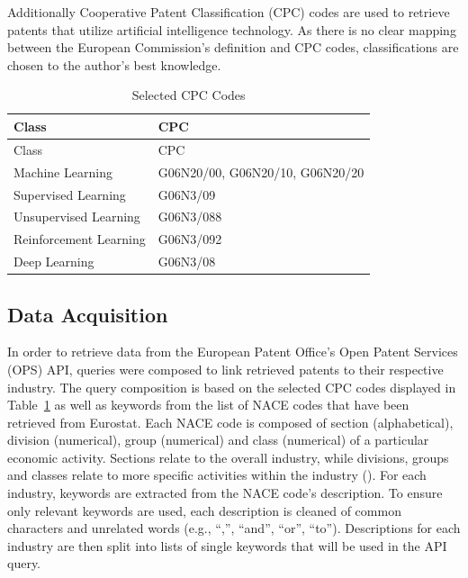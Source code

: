 \documentclass[
  11,
  a4paperpaper,
]{article}
\begin{document}
Additionally Cooperative Patent Classification (CPC) codes are used to
retrieve patents that utilize artificial intelligence technology. As
there is no clear mapping between the European Commission's definition
and CPC codes, classifications are chosen to the author's best
knowledge.


\label{tbl-cpc-codes}
\begin{longtable}[]{@{}ll@{}}
\caption{\label{tbl-cpc-codes}Selected CPC Codes}\tabularnewline
\toprule\noalign{}
Class & CPC \\
\midrule\noalign{}
\endfirsthead
\toprule\noalign{}
Class & CPC \\
\midrule\noalign{}
\endhead
\bottomrule\noalign{}
\endlastfoot
Machine Learning & G06N20/00, G06N20/10, G06N20/20 \\
Supervised Learning & G06N3/09 \\
Unsupervised Learning & G06N3/088 \\
Reinforcement Learning & G06N3/092 \\
Deep Learning & G06N3/08 \\
\end{longtable}


\subsection{Data Acquisition}\label{sec-data-acquisition}

In order to retrieve data from the European Patent Office's Open Patent
Services (OPS) API, queries were composed to link retrieved patents to
their respective industry. The query composition is based on the
selected CPC codes displayed in Table~\ref{tbl-cpc-codes} as well as
keywords from the list of NACE codes that have been retrieved from
Eurostat. Each NACE code is composed of section (alphabetical), division
(numerical), group (numerical) and class (numerical) of a particular
economic activity. Sections relate to the overall industry, while
divisions, groups and classes relate to more specific activities within
the industry (). For each
industry, keywords are extracted from the NACE code's description. To
ensure only relevant keywords are used, each description is cleaned of
common characters and unrelated words (e.g., ``,'', ``and'', ``or'',
``to''). Descriptions for each industry are then split into lists of
single keywords that will be used in the API query.
\end{document}
